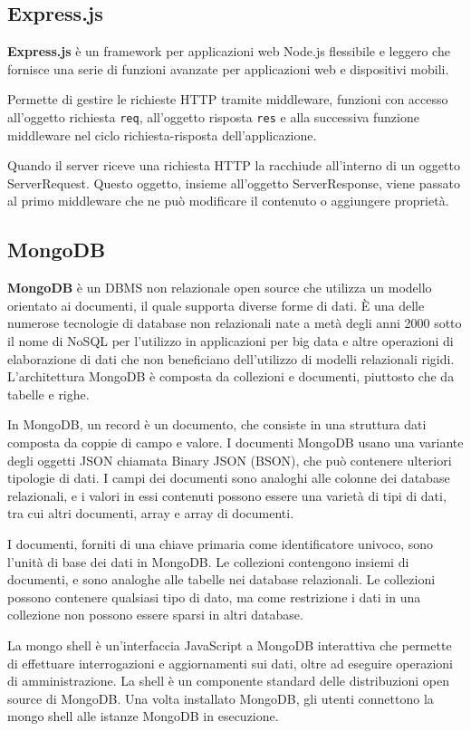 \subsection{Express.js}
\textbf{Express.js} è un framework per applicazioni web Node.js flessibile e leggero che fornisce una serie di funzioni avanzate per applicazioni web e dispositivi mobili.

Permette di gestire le richieste HTTP tramite middleware, funzioni con accesso all’oggetto richiesta \texttt{req}, all’oggetto risposta \texttt{res} e alla successiva funzione middleware nel ciclo richiesta-risposta dell’applicazione.

Quando il server riceve una richiesta HTTP la racchiude all’interno di un oggetto ServerRequest. Questo oggetto, insieme all’oggetto ServerResponse, viene passato al primo middleware che ne può modificare il contenuto o aggiungere proprietà.

\subsection{MongoDB}
\textbf{MongoDB} è un DBMS non relazionale open source che utilizza un modello orientato ai documenti, il quale supporta diverse forme di dati. È una delle numerose tecnologie di database non relazionali nate a metà degli anni 2000 sotto il nome di NoSQL per l'utilizzo in applicazioni per big data e altre operazioni di elaborazione di dati che non beneficiano dell'utilizzo di modelli relazionali rigidi. L'architettura MongoDB è composta da collezioni e documenti, piuttosto che da tabelle e righe.

In MongoDB, un record è un documento, che consiste in una struttura dati composta da coppie di campo e valore. I documenti MongoDB usano una variante degli oggetti JSON chiamata Binary JSON (BSON), che può contenere ulteriori tipologie di dati.
I campi dei documenti sono analoghi alle colonne dei database relazionali, e i valori in essi contenuti possono essere una varietà di tipi di dati, tra cui altri documenti, array e array di documenti.

I documenti, forniti di una chiave primaria come identificatore univoco, sono l'unità di base dei dati in MongoDB. Le collezioni contengono insiemi di documenti, e sono analoghe alle tabelle nei database relazionali. Le collezioni possono contenere qualsiasi tipo di dato, ma come restrizione i dati in una collezione non possono essere sparsi in altri database.

La mongo shell è un'interfaccia JavaScript a MongoDB interattiva che permette di effettuare interrogazioni e aggiornamenti sui dati, oltre ad eseguire operazioni di amministrazione. La shell è un componente standard delle distribuzioni open source di MongoDB. Una volta installato MongoDB, gli utenti connettono la mongo shell alle istanze MongoDB in esecuzione.

